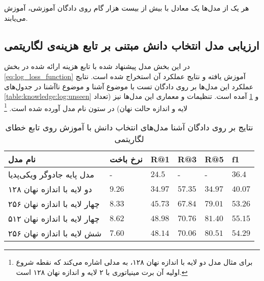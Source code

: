 هر یک از مدل‌ها یک 
معادل با بیش از بیست هزار گام روی دادگان آموزشی، آموزش می‌یابند.

\subsection{ارزیابی مدل انتخاب دانش مبتنی بر تابع هزینه‌ی لگاریتمی }
\label{chap5:log_eval}
در این بخش مدل‌ پیشنهاد شده با تابع هزینه ارائه شده در بخش 
\ref{eq:log_loss_function}
آموزش یافته و نتایج عملکرد آن استخراج شده است. نتایج عملکرد این مدل‌ها بر روی دادگان تست با موضوع آشنا و موضوع ناآشنا در جدول‌های 
\ref{table:knowledge:log:unseen}
و 
\ref{table:knowledge:log:seen}
آمده است. تنظیمات و معماری این مدل‌ها نیز (تعداد لایه و اندازه حالت نهان) در ستون نام مدل آورده شده است.
\footnote{برای مثال مدل دو لایه با اندازه نهان ۱۲۸، به مدلی اشاره می‌کند که نقطه شروع اولیه آن برت مینیاتوری با ۲ لایه و اندازه نهان ۱۲۸ است.}

\begin{table}[h]
	\caption{نتایج بر روی دادگان آشنا مدل‌های انتخاب دانش با آموزش روی تابع خطای لگاریتمی }
	\centering
	\label{table:knowledge:log:seen}
	\begin{tabular}{|l|l|l|l|l|l|}
		\hline
		نام مدل                      & نرخ باخت & R@1     & R@3     & R@5     & f1      \\ \hline
		مدل پایه جادوگر ویکی‌پدیا    & -        & $24.5$  & -       & -       & $36.4$  \\ \hline
		دو لایه با اندازه نهان ۱۲۸   & $9.26$   & $34.97$ & $57.35$ & $34.97$ & $40.07$ \\ \hline
		چهار لایه با اندازه نهان ۲۵۶ & $8.33$   & $45.73$ & $67.84$ & $79.01$ & $53.26$ \\ \hline
		چهار لایه با اندازه نهان ۵۱۲ & $8.62$   & $48.98$ & $70.76$ & $81.40$ & $55.15$ \\ \hline
		شش لایه با اندازه نهان ۲۵۶   & $7.60$   & $48.14$ & $70.06$ & $80.51$ & $54.29$ \\ \hline
	\end{tabular}
\end{table}


